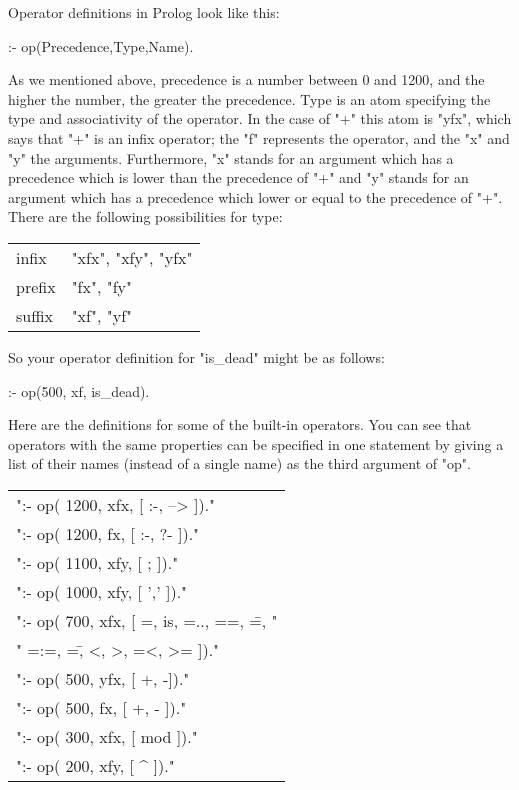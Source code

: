 Operator definitions in Prolog look like this:  
\begin{LPNcodedisplay}
:- op(Precedence,Type,Name).
\end{LPNcodedisplay}
As we mentioned above, precedence is a number between 0 and 1200, and
the higher the number, the greater the  precedence.
Type is an
atom specifying the type and associativity of the operator. In the
case of "+" this atom is "yfx", which says that "+" is an infix
operator; the "f" represents the operator,  and the "x" and "y" the
arguments.  Furthermore, "x" stands for an argument which has a
precedence which is lower than the precedence of "+" and "y" stands
for an argument which has a precedence which lower or equal to the
precedence of "+".  There are the following possibilities for
type:
\begin{center}\begin{tabular}{ll}
infix&"xfx", "xfy", "yfx"\\
prefix&"fx", "fy"\\
suffix&"xf", "yf"
\end{tabular}\end{center}

So  your operator definition for "is_dead" might be as follows:
\begin{LPNcodedisplay}
:- op(500, xf, is_dead).
\end{LPNcodedisplay}


Here are the definitions for some of the built-in operators. You can see
that operators with the same properties can be specified in one statement
by giving a list of their names (instead of a single name) as the third
argument of "op".

\begin{center}\begin{tabular}{l}
":- op( 1200, xfx, [ :-, --> ])."\\
":- op( 1200,  fx, [ :-, ?- ])."\\
":- op( 1100, xfy, [ ; ])."\\
":- op( 1000, xfy, [ ',' ])."\\
":- op(  700, xfx, [ =, is, =.., ==, \==, "\\
"                    =:=, =\=, <, >, =<, >= ])."\\
":- op(  500, yfx, [ +, -])."\\
":- op(  500,  fx, [ +, - ])."\\
":- op(  300, xfx, [ mod ])."\\
":- op(  200, xfy, [ ^ ])."
\end{tabular}\end{center}

